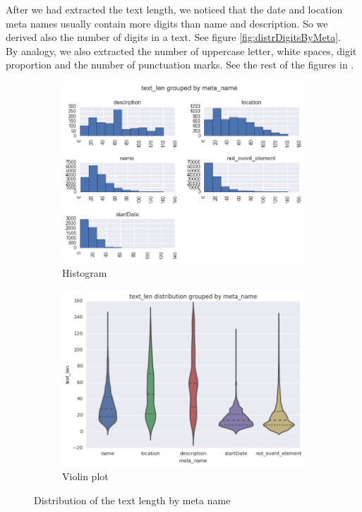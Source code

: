 After we had extracted the text length, we noticed that the date and location meta names usually contain more digits than name and description. So we derived also the number of digits in a text. See figure \ref{fig:distrDigitsByMeta}.\\

By analogy, we also extracted the number of uppercase letter, white spaces, digit proportion and the number of punctuation marks. See the rest of the figures in .

\begin{figure}[h]
\begin{subfigure}{.5\textwidth}
  \centering
  \includegraphics[width=1\textwidth]{figures07/distrTextByMeta}
  \caption{Histogram}
\end{subfigure}
\begin{subfigure}{.5\textwidth}
  \centering
  \includegraphics[width=1\textwidth]{figures07/distrTextByMeta_violin}
  \caption{Violin plot}
\end{subfigure}
\caption{Distribution of the text length by meta name}
\label{fig:distrTextByMeta}
\end{figure}


